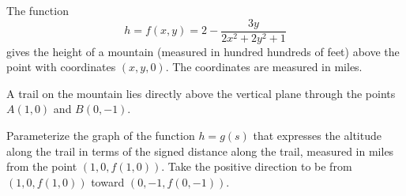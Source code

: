 \documentclass{ximera}
\begin{document}
\begin{exploration}  \label{Edddd33332}
The function
\[
     h = f(x,y) = 2 - \frac{3y}{2x^2+2y^2+1}
\]
gives the height of a mountain (measured in hundred hundreds of feet) above the point with coordinates $(x,y,0)$. The coordinates are measured in miles.

A trail on the mountain lies directly above the vertical plane through the points $A(1,0)$ and $B(0,-1)$.

Parameterize the graph of the function $h=g(s)$ that expresses the altitude along the trail in terms of the signed distance along the trail, measured in miles from the point $(1,0,f(1,0))$. Take the positive direction to be from $(1,0,f(1,0))$ toward $(0,-1,f(0,-1))$. 


\end{exploration}
\end{document}
